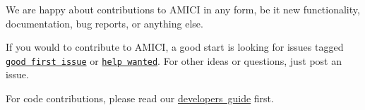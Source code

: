 We are happy about contributions to A\+M\+I\+CI in any form, be it new functionality, documentation, bug reports, or anything else.

If you would to contribute to A\+M\+I\+CI, a good start is looking for issues tagged \href{https://github.com/ICB-DCM/AMICI/issues?q=is\%3Aissue+is\%3Aopen+label\%3A\%22good+first+issue\%22}{\texttt{ {\ttfamily good first issue}}} or \href{https://github.com/ICB-DCM/AMICI/issues?q=is\%3Aissue+is\%3Aopen+label\%3A\%22help+wanted\%22}{\texttt{ {\ttfamily help wanted}}}. For other ideas or questions, just post an issue.

For code contributions, please read our \mbox{\hyperlink{md_documentation_development}{developer\textquotesingle{}s guide}} first. 